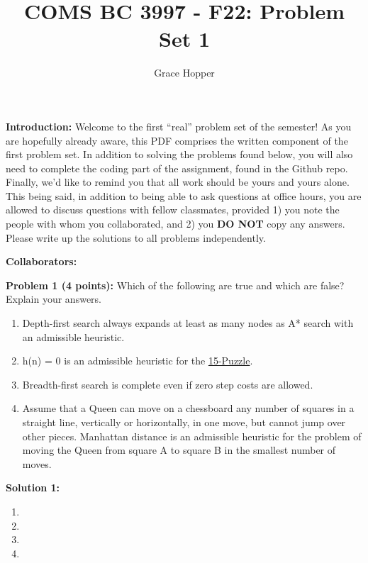 \documentclass[]{article}
\title{COMS BC 3997 - F22: Problem Set 1}
\author{Grace Hopper}
\date{}
\begin{document}
\maketitle %

\textbf{Introduction:}  
Welcome to the first ``real'' problem set of the semester!  As you are hopefully already aware, this PDF comprises the written component of the first problem set.  In addition to solving the problems found below, you will also need to complete the coding part of the assignment, found in the Github repo. Finally, we'd like to remind you that all work should be yours and yours alone. This being said, in addition to being able to ask questions at office hours, you are allowed to discuss questions with fellow classmates, provided 1) you note the people with whom you collaborated, and 2) you \textbf{DO NOT} copy any answers. Please write up the solutions to all problems independently.

\bigskip
\textbf{Collaborators:}
\clearpage

\textbf{Problem 1 (4 points):}
Which of the following are true and which are false? Explain your answers.

\begin{enumerate}[label=(\alph*)]
    \item Depth-first search always expands at least as many nodes as A* search with an admissible heuristic.
    \item h(n) = 0 is an admissible heuristic for the \href{https://en.wikipedia.org/wiki/15_puzzle}{15-Puzzle}.
    \item Breadth-first search is complete even if zero step costs are allowed.
    \item Assume that a Queen can move on a chessboard any number of squares in a straight line, vertically or horizontally, in one move, but cannot jump over other pieces. Manhattan distance is an admissible heuristic for the problem of moving the Queen from square A to square B in the smallest number of moves.
\end{enumerate}

\bigskip

\textbf{Solution 1:}
\begin{enumerate}[label=(\alph*)]
    \item %
    \item %
    \item %
    \item %
\end{enumerate}
\end{document}
